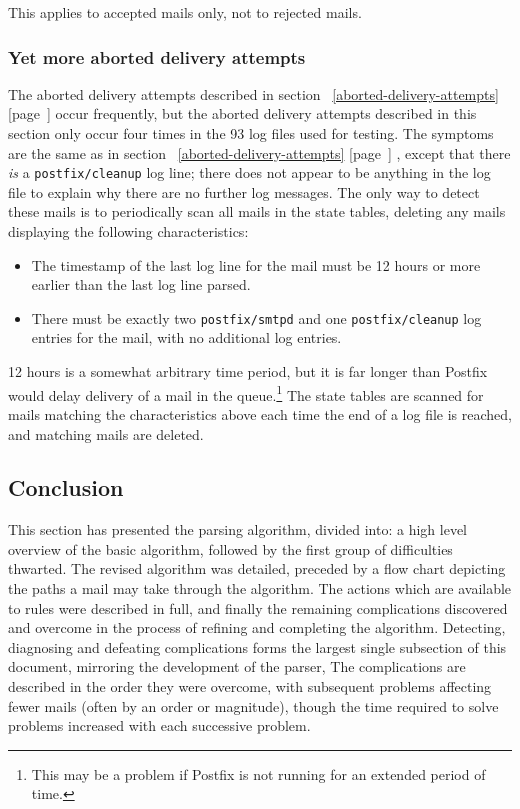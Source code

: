 \documentclass[a4paper,12pt,draft]{article}
\newcommand{\refwithpage}[1]{%
    \empty{}\ref{#1} [page~\pageref{#1}]%
}
\begin{document}
This applies to accepted mails only, not to rejected mails.

\subsubsection{Yet more aborted delivery attempts}

\label{yet-more-aborted-delivery-attempts}

The aborted delivery attempts described in
section~\refwithpage{aborted-delivery-attempts} occur frequently, but the
aborted delivery attempts described in this section only occur four times
in the 93 log files used for testing.  The symptoms are the same as in
section~\refwithpage{aborted-delivery-attempts}, except that there
\textit{is\/} a \texttt{postfix/cleanup} log line; there does not appear to
be anything in the log file to explain why there are no further log
messages.  The only way to detect these mails is to periodically scan all
mails in the state tables, deleting any mails displaying the following
characteristics:

\begin{itemize}

    \item The timestamp of the last log line for the mail must be 12 hours
        or more earlier than the last log line parsed.

    \item There must be exactly two \texttt{postfix/smtpd} and one
        \texttt{postfix/cleanup} log entries for the mail, with no
        additional log entries.

\end{itemize}

12 hours is a somewhat arbitrary time period, but it is far longer than
Postfix would delay delivery of a mail in the queue.\footnote{This may be a
problem if Postfix is not running for an extended period of time.}  The
state tables are scanned for mails matching the characteristics above each
time the end of a log file is reached, and matching mails are deleted.

\subsection{Conclusion}

This section has presented the parsing algorithm, divided into: a high
level overview of the basic algorithm, followed by the first group of
difficulties thwarted.  The revised algorithm was detailed, preceded by a
flow chart depicting the paths a mail may take through the algorithm.  The
actions which are available to rules were described in full, and finally
the remaining complications discovered and overcome in the process of
refining and completing the algorithm.  Detecting, diagnosing and defeating
complications forms the largest single subsection of this document,
mirroring the development of the parser,  The complications are described
in the order they were overcome, with subsequent problems affecting fewer
mails (often by an order or magnitude), though the time required to solve
problems increased with each successive problem.
\end{document}
